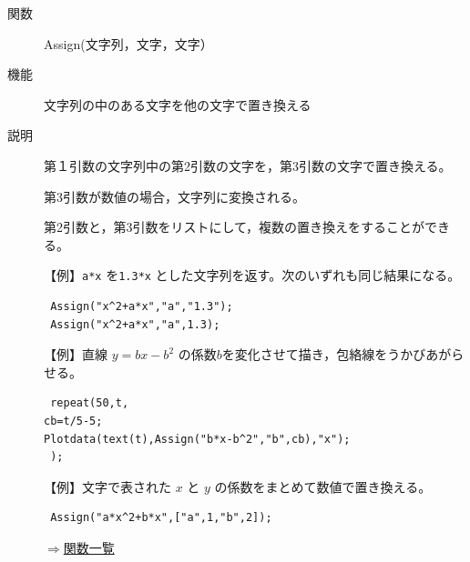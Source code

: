 \documentclass[papersize,a4paper,12pt,uplatex]{jsarticle}
\begin{document}
\begin{description}


\hypertarget{assign}{}
\item[関数]Assign(文字列，文字，文字）
\item[機能]文字列の中のある文字を他の文字で置き換える
\item[説明]第１引数の文字列中の第2引数の文字を，第3引数の文字で置き換える。

第3引数が数値の場合，文字列に変換される。

第2引数と，第3引数をリストにして，複数の置き換えをすることができる。

\vspace{\baselineskip}
【例】\verb|a*x| を\verb|1.3*x| とした文字列を返す。次のいずれも同じ結果になる。
\begin{verbatim}
 Assign("x^2+a*x","a","1.3"); 
 Assign("x^2+a*x","a",1.3);
\end{verbatim}

\vspace{\baselineskip}
【例】直線 $y=bx-b^2$ の係数$b$を変化させて描き，包絡線をうかびあがらせる。
\begin{verbatim}
 repeat(50,t,
cb=t/5-5;
Plotdata(text(t),Assign("b*x-b^2","b",cb),"x");
 );
\end{verbatim}
\begin{center}  \end{center}
\vspace{\baselineskip}
【例】文字で表された $x$ と $y$ の係数をまとめて数値で置き換える。
\begin{verbatim} 
 Assign("a*x^2+b*x",["a",1,"b",2]);
\end{verbatim}

\begin{flushright}\hyperlink{functionlist}{$\Rightarrow$関数一覧}\end{flushright}

\end{description}
\end{document}
